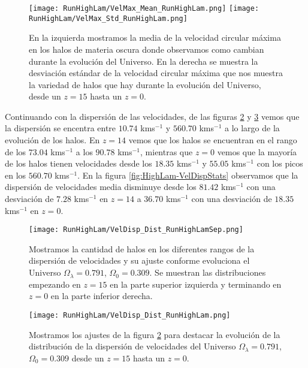 \begin{figure}[H]
    \centering
    \texttt{[image: RunHighLam/VelMax\_Mean\_RunHighLam.png]}
    \texttt{[image: RunHighLam/VelMax\_Std\_RunHighLam.png]}
    \caption[Media y desviación estándar de la velocidad circular máxima]{\footnotesize En la izquierda mostramos la media de la velocidad circular máxima en los halos de materia oscura donde observamos como cambian durante la evolución del Universo. En la derecha se muestra la desviación estándar de la velocidad circular máxima que nos muestra la variedad de halos que hay durante la evolución del Universo, desde un $z=15$ hasta un $z=0$.}
    \label{fig:HighLam-VelMaxStats}
\end{figure}

Continuando con la dispersión de las velocidades, de las figuras \ref{fig:HighLam-VelDispDistSep} y \ref{fig:HighLam-VelDispDist} vemos que la dispersión se encentra entre $10.74$ kms$^{-1}$ y $560.70$ kms$^{-1}$ a lo largo de la evolución de los halos. En $z=14$ vemos que los halos se encuentran en el rango de los $73.04$ kms$^{-1}$ a los $90.78$ kms$^{-1}$, mientras que $z=0$ vemos que la mayoría de los halos tienen velocidades desde los $18.35$ kms$^{-1}$ y $55.05$ kms$^{-1}$ con los picos en los $560.70$ kms$^{-1}$. En la figura \ref{fig:HighLam-VelDispStats} observamos que la dispersión de velocidades media disminuye desde los $81.42$ kms$^{-1}$ con una desviación de $7.28$ kms$^{-1}$ en $z=14$ a $36.70$ kms$^{-1}$ con una desviación de $18.35$ kms$^{-1}$ en $z=0$.

\begin{figure}[H]
    \centering
    \texttt{[image: RunHighLam/VelDisp\_Dist\_RunHighLamSep.png]}
    \caption[Dispersión de velocidades]{\footnotesize Mostramos la cantidad de halos en los diferentes rangos de la dispersión de velocidades y su ajuste conforme evoluciona el Universo $\Omega_\lambda = 0.791$, $\Omega_0 = 0.309$. Se muestran las distribuciones empezando en $z=15$ en la parte superior izquierda y terminando en $z=0$ en la parte inferior derecha.}
    \label{fig:HighLam-VelDispDistSep}
\end{figure}

\begin{figure}[H]
    \centering
    \texttt{[image: RunHighLam/VelDisp\_Dist\_RunHighLam.png]}
    \caption[Distribución de la dispersión de velocidades]{\footnotesize Mostramos los ajustes de la figura \ref{fig:HighLam-VelDispDistSep} para destacar la evolución de la distribución de la dispersión de velocidades del Universo $\Omega_\lambda = 0.791$, $\Omega_0 = 0.309$ desde un $z=15$ hasta un $z=0$.}
    \label{fig:HighLam-VelDispDist}
\end{figure}

